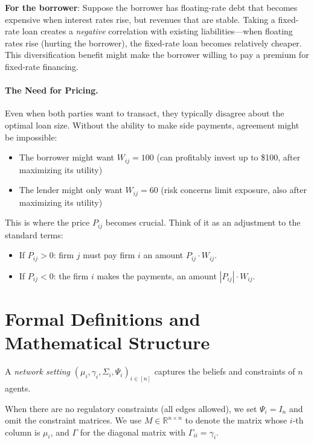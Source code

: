 \begin{example}
\textbf{For the borrower}: Suppose the borrower has floating-rate debt that becomes expensive when interest rates rise, but revenues that are stable. Taking a fixed-rate loan creates a \textit{negative} correlation with existing liabilities—when floating rates rise (hurting the borrower), the fixed-rate loan becomes relatively cheaper. This diversification benefit might make the borrower willing to pay a premium for fixed-rate financing.

\paragraph{The Need for Pricing.} Even when both parties want to transact, they typically disagree about the optimal loan size. Without the ability to make side payments, agreement might be impossible:

\begin{itemize}
    \item The borrower might want $W_{ij} = 100$ (can profitably invest up to \$100, after maximizing its utility)
    \item The lender might only want $W_{ij} = 60$ (risk concerns limit exposure, also after maximizing its utility)
\end{itemize}

This is where the price $P_{ij}$ becomes crucial. Think of it as an adjustment to the standard terms:

\begin{itemize}
    \item If $P_{ij} > 0$: firm $j$ must pay firm $i$ an amount $P_{ij} \cdot W_{ij}$. 
    
    \item If $P_{ij} < 0$: the firm $i$ makes the payments, an amount $|P_{ij}| \cdot W_{ij}$. 
\end{itemize}
\end{example}

\section{Formal Definitions and Mathematical Structure}

\begin{definition}
\label{def:original_network_setting}
A \textit{network setting} $(\mu_i, \gamma_i, \Sigma_i, \Psi_i)_{i \in [n]}$ captures the beliefs and constraints of $n$ agents.

When there are no regulatory constraints (all edges allowed), we set $\Psi_i = I_n$ and omit the constraint matrices. We use $M \in \mathbb{R}^{n \times n}$ to denote the matrix whose $i$-th column is $\mu_i$, and $\Gamma$ for the diagonal matrix with $\Gamma_{ii} = \gamma_i$.
\end{definition}

